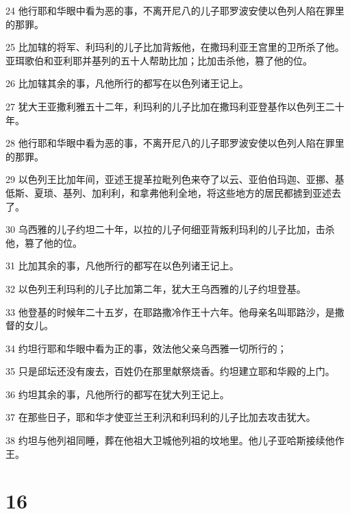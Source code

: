 \par 24 他行耶和华眼中看为恶的事，不离开尼八的儿子耶罗波安使以色列人陷在罪里的那罪。
\par 25 比加辖的将军、利玛利的儿子比加背叛他，在撒玛利亚王宫里的卫所杀了他。亚珥歌伯和亚利耶并基列的五十人帮助比加；比加击杀他，篡了他的位。
\par 26 比加辖其余的事，凡他所行的都写在以色列诸王记上。
\par 27 犹大王亚撒利雅五十二年，利玛利的儿子比加在撒玛利亚登基作以色列王二十年。
\par 28 他行耶和华眼中看为恶的事，不离开尼八的儿子耶罗波安使以色列人陷在罪里的那罪。
\par 29 以色列王比加年间，亚述王提革拉毗列色来夺了以云、亚伯伯玛迦、亚挪、基低斯、夏琐、基列、加利利，和拿弗他利全地，将这些地方的居民都掳到亚述去了。
\par 30 乌西雅的儿子约坦二十年，以拉的儿子何细亚背叛利玛利的儿子比加，击杀他，篡了他的位。
\par 31 比加其余的事，凡他所行的都写在以色列诸王记上。
\par 32 以色列王利玛利的儿子比加第二年，犹大王乌西雅的儿子约坦登基。
\par 33 他登基的时候年二十五岁，在耶路撒冷作王十六年。他母亲名叫耶路沙，是撒督的女儿。
\par 34 约坦行耶和华眼中看为正的事，效法他父亲乌西雅一切所行的；
\par 35 只是邱坛还没有废去，百姓仍在那里献祭烧香。约坦建立耶和华殿的上门。
\par 36 约坦其余的事，凡他所行的都写在犹大列王记上。
\par 37 在那些日子，耶和华才使亚兰王利汛和利玛利的儿子比加去攻击犹大。
\par 38 约坦与他列祖同睡，葬在他祖大卫城他列祖的坟地里。他儿子亚哈斯接续他作王。

\chapter{16}

